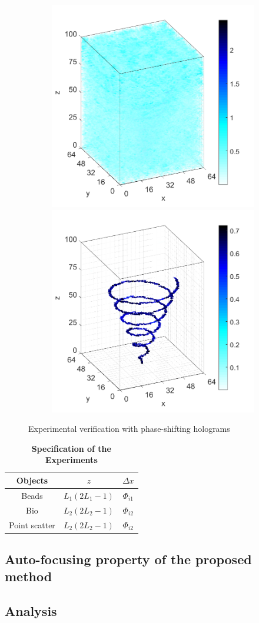 \documentclass[9pt,twocolumn,twoside]{osajnl}
\begin{document}
\begin{figure}[H]
{\begin{subfigure}[b]{0.95\columnwidth}
\begin{minipage}[b]{0.15\columnwidth}
    \end{minipage}
    \includegraphics[width=0.33\columnwidth]{conhelix_complex_BP_3d}
    \includegraphics[width=0.33\columnwidth]{conhelix_complex_TwIST_3d}
    \caption{}
\end{subfigure}}
\caption{Experimental verification with phase-shifting holograms}
\label{fig_exp}
\end{figure}

\begin{table}[H]
\centering
\caption{\bf Specification of the Experiments}
\begin{tabular}{ccc}
\hline
Objects & $z$         & $\Delta x$ \\
\hline
Beads & $L_1(2L_1-1)$ & $\Phi_{i1}$ \\
Bio   & $L_2(2L_2-1)$ & $\Phi_{i2}$ \\
Point scatter  & $L_2(2L_2-1)$ & $\Phi_{i2}$ \\
\hline
\end{tabular}
\label{tb_expspec}
\end{table}

\subsection{Auto-focusing property of the proposed method}

\subsection{Analysis}

\end{document}
